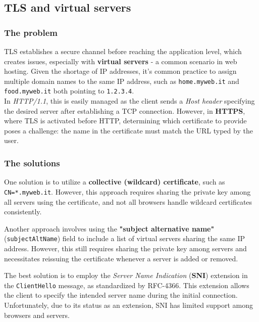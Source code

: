 \subsection{TLS and virtual servers}

\subsubsection{The problem}

TLS establishes a secure channel before reaching the application level, which creates issues, especially with \textbf{virtual servers} - a common scenario in web hosting. Given the shortage of IP addresses, it's common practice to assign multiple domain names to the same IP address, such as \texttt{home.myweb.it} and \texttt{food.myweb.it} both pointing to \texttt{1.2.3.4}.\\
In \textit{HTTP/1.1}, this is easily managed as the client sends a \textit{Host header} specifying the desired server after establishing a TCP connection. However, in \textbf{HTTPS}, where TLS is activated before HTTP, determining which certificate to provide poses a challenge: the name in the certificate must match the URL typed by the user.

\subsubsection{The solutions}

One solution is to utilize a \textbf{collective (wildcard) certificate}, such as \texttt{CN=*.myweb.it}.
However, this approach requires sharing the private key among all servers using the certificate, and not all browsers handle wildcard certificates consistently.

Another approach involves using the \textbf{"subject alternative name"} (\texttt{subjectAltName}) field to include a list of virtual servers sharing the same IP address. However, this still requires sharing the private key among servers and necessitates reissuing the certificate whenever a server is added or removed.

The best solution is to employ the \textit{Server Name Indication} (\textbf{SNI}) extension in the \texttt{ClientHello} message, as standardized by RFC-4366. This extension allows the client to specify the intended server name during the initial connection. Unfortunately, due to its status as an extension, SNI has limited support among browsers and servers.



